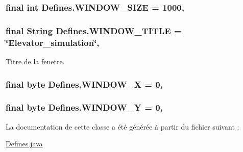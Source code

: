 \hypertarget{classDefines_aafb660e1c1534aec4d2cee6cfe57029f}{
\subsubsection[{W\-I\-N\-D\-O\-W\-\_\-\-S\-I\-Z\-E}]{\setlength{\rightskip}{0pt plus 5cm}final int Defines.\-W\-I\-N\-D\-O\-W\-\_\-\-S\-I\-Z\-E = 1000\hspace{0.3cm}{\ttfamily [static]}, {\ttfamily [package]}}}\label{classDefines_aafb660e1c1534aec4d2cee6cfe57029f}
\hypertarget{classDefines_a4f7489d3112fc05c39005576c0783f92}{
\subsubsection[{W\-I\-N\-D\-O\-W\-\_\-\-T\-I\-T\-L\-E}]{\setlength{\rightskip}{0pt plus 5cm}final String Defines.\-W\-I\-N\-D\-O\-W\-\_\-\-T\-I\-T\-L\-E = \char`\"{}Elevator\-\_\-simulation\char`\"{}\hspace{0.3cm}{\ttfamily [static]}, {\ttfamily [package]}}}\label{classDefines_a4f7489d3112fc05c39005576c0783f92}


Titre de la fenetre. 

\hypertarget{classDefines_a191ee33a73c60eed6efed2b7dfd5947d}{
\subsubsection[{W\-I\-N\-D\-O\-W\-\_\-\-X}]{\setlength{\rightskip}{0pt plus 5cm}final byte Defines.\-W\-I\-N\-D\-O\-W\-\_\-\-X = 0\hspace{0.3cm}{\ttfamily [static]}, {\ttfamily [package]}}}\label{classDefines_a191ee33a73c60eed6efed2b7dfd5947d}
\hypertarget{classDefines_a15d26191713a84100e6850d2ba539d8f}{
\subsubsection[{W\-I\-N\-D\-O\-W\-\_\-\-Y}]{\setlength{\rightskip}{0pt plus 5cm}final byte Defines.\-W\-I\-N\-D\-O\-W\-\_\-\-Y = 0\hspace{0.3cm}{\ttfamily [static]}, {\ttfamily [package]}}}\label{classDefines_a15d26191713a84100e6850d2ba539d8f}


La documentation de cette classe a été générée à partir du fichier suivant \-:\begin{DoxyCompactItemize}
\item 
\hyperlink{Defines_8java}{Defines.\-java}\end{DoxyCompactItemize}
